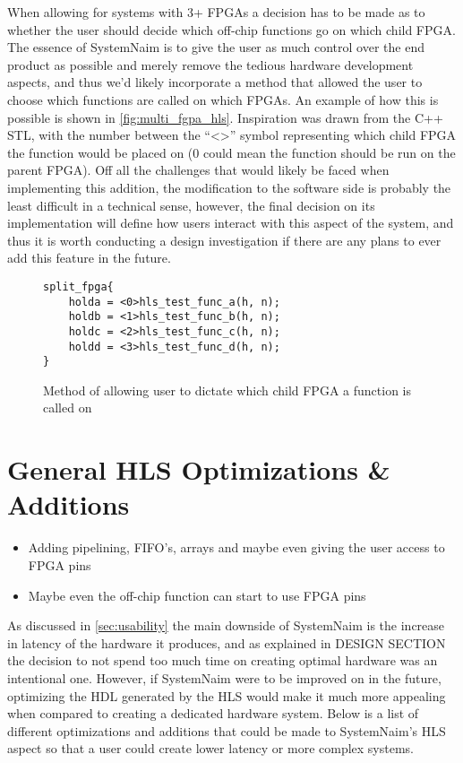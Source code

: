 When allowing for systems with 3+ FPGAs a decision has to be made as to whether the user should decide which off-chip functions go on which child FPGA. The essence of SystemNaim is to give the user as much control over the end product as possible and merely remove the tedious hardware development aspects, and thus we'd likely incorporate a method that allowed the user to choose which functions are called on which FPGAs. An example of how this is possible is shown in \autoref{fig:multi_fgpa_hls}. Inspiration was drawn from the C++ STL, with the number between the “<>” symbol representing which child FPGA the function would be placed on (0 could mean the function should be run on the parent FPGA). Off all the challenges that would likely be faced when implementing this addition, the modification to the software side is probably the least difficult in a technical sense, however, the final decision on its implementation will define how users interact with this aspect of the system, and thus it is worth conducting a design investigation if there are any plans to ever add this feature in the future.

\begin{figure}[!h]
    \centering
    \begin{minipage}{0.5\textwidth}
    \begin{verbatim}
split_fpga{
    holda = <0>hls_test_func_a(h, n);
    holdb = <1>hls_test_func_b(h, n);
    holdc = <2>hls_test_func_c(h, n);
    holdd = <3>hls_test_func_d(h, n);
}
    \end{verbatim}     
    \end{minipage}
    \caption{Method of allowing user to dictate which child FPGA a function is called on}
    \label{fig:multi_fgpa_hls}
\end{figure}

\section{General HLS Optimizations \& Additions}

\begin{itemize}
    \item Adding pipelining, FIFO's, arrays and maybe even giving the user access to FPGA pins
    \item Maybe even the off-chip function can start to use FPGA pins
\end{itemize}

As discussed in \autoref{sec:usability} the main downside of SystemNaim is the increase in latency of the hardware it produces, and as explained in DESIGN SECTION the decision to not spend too much time on creating optimal hardware was an intentional one. However, if SystemNaim were to be improved on in the future, optimizing the HDL generated by the HLS would make it much more appealing when compared to creating a dedicated hardware system. Below is a list of different optimizations and additions that could be made to SystemNaim's HLS aspect so that a user could create lower latency or more complex systems.

